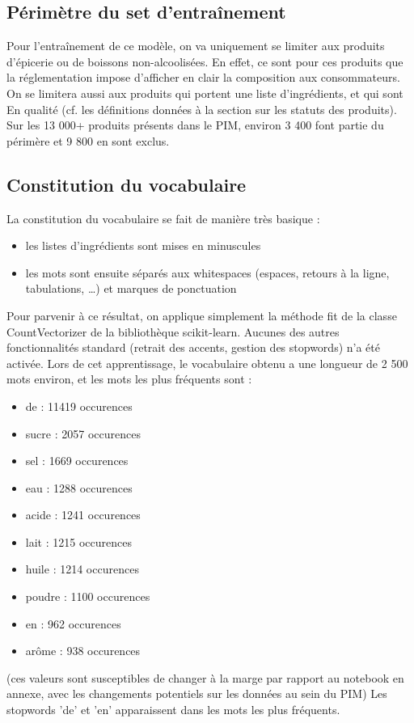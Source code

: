             \subsection{Périmètre du set d'entraînement}
            
            Pour l'entraînement de ce modèle, on va uniquement se limiter aux produits d'épicerie ou de boissons non-alcoolisées.
            En effet, ce sont pour ces produits que la réglementation impose d'afficher en clair la composition aux consommateurs.
            On se limitera aussi aux produits qui portent une liste d'ingrédients, et qui sont \og En qualité \fg (cf. les définitions données à la section  sur les statuts des produits).
            Sur les 13 000+ produits présents dans le PIM, environ 3 400 font partie du périmère et 9 800 en sont exclus.

            \subsection{Constitution du vocabulaire}

            La constitution du vocabulaire se fait de manière très basique : 
            \begin{itemize}
                \item les listes d'ingrédients sont mises en minuscules
                \item les mots sont ensuite séparés aux whitespaces (espaces, retours à la ligne, tabulations, \dots) et marques de ponctuation
            \end{itemize}
            Pour parvenir à ce résultat, on applique simplement la méthode fit de la classe CountVectorizer de la bibliothèque scikit-learn.
            Aucunes des autres fonctionnalités standard (retrait des accents, gestion des stopwords) n'a été activée.
            Lors de cet apprentissage, le vocabulaire obtenu a une longueur de 2 500 mots environ, et les mots les plus fréquents sont :
            \begin{itemize}
                \item de     : 11419 occurences
                \item sucre  :  2057 occurences 
                \item sel    :  1669 occurences
                \item eau    :  1288 occurences
                \item acide  :  1241 occurences
                \item lait   :  1215 occurences
                \item huile  :  1214 occurences
                \item poudre :  1100 occurences
                \item en     :   962 occurences
                \item arôme  :   938 occurences
            \end{itemize}
            (ces valeurs sont susceptibles de changer à la marge par rapport au notebook en annexe, avec les changements potentiels sur les données au sein du PIM)
            Les stopwords 'de' et 'en' apparaissent dans les mots les plus fréquents.        
        
